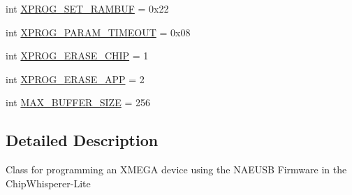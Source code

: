 \begin{DoxyCompactItemize}
\item 
int \hyperlink{classsoftware_1_1chipwhisperer_1_1hardware_1_1naeusb_1_1programmer__xmega_1_1XMEGAPDI_a5b3c4dd9271917ac3e30fd0ac0fe12f0}{X\+P\+R\+O\+G\+\_\+\+S\+E\+T\+\_\+\+R\+A\+M\+B\+U\+F} = 0x22
\item 
int \hyperlink{classsoftware_1_1chipwhisperer_1_1hardware_1_1naeusb_1_1programmer__xmega_1_1XMEGAPDI_a2ebffaae33ab69c7c29136b06936f6fe}{X\+P\+R\+O\+G\+\_\+\+P\+A\+R\+A\+M\+\_\+\+T\+I\+M\+E\+O\+U\+T} = 0x08
\item 
int \hyperlink{classsoftware_1_1chipwhisperer_1_1hardware_1_1naeusb_1_1programmer__xmega_1_1XMEGAPDI_aaa8b53519e9dd259cdf8695276971ac0}{X\+P\+R\+O\+G\+\_\+\+E\+R\+A\+S\+E\+\_\+\+C\+H\+I\+P} = 1
\item 
int \hyperlink{classsoftware_1_1chipwhisperer_1_1hardware_1_1naeusb_1_1programmer__xmega_1_1XMEGAPDI_a37d3144592fa945d41b95e79c6fac0e7}{X\+P\+R\+O\+G\+\_\+\+E\+R\+A\+S\+E\+\_\+\+A\+P\+P} = 2
\item 
int \hyperlink{classsoftware_1_1chipwhisperer_1_1hardware_1_1naeusb_1_1programmer__xmega_1_1XMEGAPDI_a947def82a41a9bf20a295b997f03b9d8}{M\+A\+X\+\_\+\+B\+U\+F\+F\+E\+R\+\_\+\+S\+I\+Z\+E} = 256
\end{DoxyCompactItemize}


\subsection{Detailed Description}
\begin{DoxyVerb}Class for programming an XMEGA device using the NAEUSB Firmware in the ChipWhisperer-Lite
\end{DoxyVerb}
 

